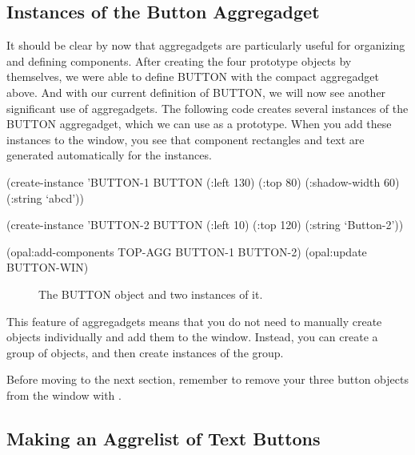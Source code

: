 \subsection{Instances of the Button Aggregadget}

It should be clear by now that aggregadgets are particularly useful
for organizing and defining components.  After creating the four
prototype objects by themselves, we were able to define BUTTON with
the compact aggregadget above.  And with our current definition of
BUTTON, we will now see another significant use of aggregadgets.  The
following code creates several instances of the BUTTON aggregadget,
which we can use as a prototype.  When you add these instances to the
window, you see that component rectangles and text are generated
automatically for the instances.

\begin{programexample}
(create-instance 'BUTTON-1 BUTTON
   (:left 130) (:top 80)
   (:shadow-width 60)
   (:string `abcd'))

(create-instance 'BUTTON-2 BUTTON
   (:left 10) (:top 120)
   (:string `Button-2'))

(opal:add-components TOP-AGG BUTTON-1 BUTTON-2)
(opal:update BUTTON-WIN)
\end{programexample}

\begin{figure}
\begin{center}
\begin{makeimage}
\end{makeimage}
\begin{latexonly}
\end{latexonly}
\end{center}
\caption{The BUTTON object and two instances of it.}
\end{figure}

This feature of aggregadgets means that you do not need to manually
create objects individually and add them to the window.  Instead, you
can create a group of objects, and then create instances of the group.

Before moving to the next section, remember to remove your three button
objects from the window with .


\subsection{Making an Aggrelist of Text Buttons}

